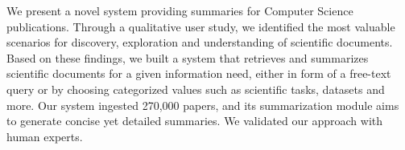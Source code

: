 We present a novel system providing summaries for Computer Science publications. 
Through a qualitative user study, we identified the most valuable scenarios for discovery, exploration and understanding of scientific documents.
Based on these findings, we built a system that retrieves and summarizes scientific documents for a given information need, either in form 
of a free-text query or by choosing categorized values such as scientific tasks, datasets and more.
Our system ingested 270,000 papers, and its summarization module aims to generate concise yet detailed summaries. We validated our approach with human experts.